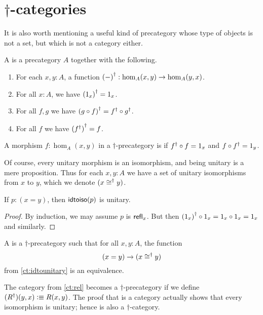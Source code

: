 \section{\texorpdfstring{$\dagger$}{†}-categories}
\label{sec:dagger-categories}

It is also worth mentioning a useful kind of precategory whose type of objects is not a set, but which is not a category either.

\begin{defn}
  A  is a precategory $A$ together with the following.
  \begin{enumerate}
  \item For each $x,y:A$, a function ${(-)}^{\dagger}:\hom_A(x,y) \to \hom_A(y,x)$.
  \item For all $x:A$, we have ${(1_x)}^{\dagger} = 1_x$.
  \item For all $f,g$ we have ${(g\circ f)}^{\dagger} = {f}^{\dagger} \circ {g}^{\dagger}$.
  \item For all $f$ we have ${({f}^{\dagger})}^{\dagger} = f$.
  \end{enumerate}
\end{defn}

\begin{defn}
  A morphism $f:\hom_A(x,y)$ in a $\dagger$-precategory is  if ${f}^{\dagger} \circ f = 1_x$ and $f\circ {f}^{\dagger} = 1_y$.
\end{defn}

Of course, every unitary morphism is an isomorphism, and being unitary is a mere proposition.
Thus for each $x,y:A$ we have a set of unitary isomorphisms from $x$ to $y$, which we denote $(x\mathrel{\cong^\dagger} y)$.

\begin{lem}\label{ct:idtounitary}
  If $p:(x=y)$, then $\mathsf{idtoiso}(p)$ is unitary.
\end{lem}
\begin{proof}
  By induction, we may assume $p$ is $\mathsf{refl}_{x}$.
  But then ${(1_x)}^{\dagger} \circ 1_x = 1_x\circ 1_x = 1_x$ and similarly.
\end{proof}

\begin{defn}
  A  is a $\dagger$-precategory such that for all $x,y:A$, the function
  \[ (x=y) \to (x \mathrel{\cong^\dagger} y) \]
  from \autoref{ct:idtounitary} is an equivalence.
\end{defn}

\begin{eg}
  The category \urel from \autoref{ct:rel} becomes a $\dagger$-precategory if we define $({R}^{\dagger})(y,x) \vcentcolon\equiv R(x,y)$.
  The proof that \urel is a category actually shows that every isomorphism is unitary; hence \urel is also a $\dagger$-category.
\end{eg}

